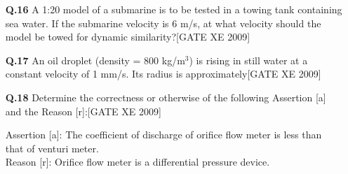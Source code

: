 \documentclass[journal,12pt,onecolumn]{IEEEtran}
\theoremstyle{remark}
\begin{document}
\begin{enumerate}
\vspace{0.3cm}

\item[\textbf{Q.16}] A 1:20 model of a submarine is to be tested in a towing tank containing sea water. If the submarine velocity is 6 m/s, at what velocity should the model be towed for dynamic similarity?\hfill[GATE XE 2009]

\begin{enumerate}
\end{enumerate}

\vspace{0.3cm}

\item[\textbf{Q.17}] An oil droplet (density = 800 kg/m$^3$) is rising in still water at a constant velocity of 1 mm/s. Its radius is approximately\hfill[GATE XE 2009]

\begin{enumerate}
\end{enumerate}

\vspace{0.3cm}

\item[\textbf{Q.18}] Determine the correctness or otherwise of the following Assertion [a] and the Reason [r]:\hfill[GATE XE 2009]

Assertion [a]: The coefficient of discharge of orifice flow meter is less than that of venturi meter.\\
Reason [r]: Orifice flow meter is a differential pressure device.

\begin{enumerate}
\end{enumerate}


\end{enumerate}
\end{document}
